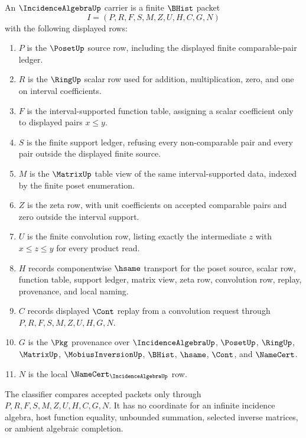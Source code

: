\begin{definition}
\label{def:incidence-algebra-carrier}
An $\IncidenceAlgebraUp$ carrier is a finite $\BHist$ packet
$$
I=(P,R,F,S,M,Z,U,H,C,G,N)
$$
with the following displayed rows:
\begin{enumerate}
\item $P$ is the $\PosetUp$ source row, including the displayed finite comparable-pair ledger.
\item $R$ is the $\RingUp$ scalar row used for addition, multiplication, zero, and one on interval coefficients.
\item $F$ is the interval-supported function table, assigning a scalar coefficient only to displayed pairs $x\leq y$.
\item $S$ is the finite support ledger, refusing every non-comparable pair and every pair outside the displayed finite source.
\item $M$ is the $\MatrixUp$ table view of the same interval-supported data, indexed by the finite poset enumeration.
\item $Z$ is the zeta row, with unit coefficients on accepted comparable pairs and zero outside the interval support.
\item $U$ is the finite convolution row, listing exactly the intermediate $z$ with $x\leq z\leq y$ for every product read.
\item $H$ records componentwise $\hsame$ transport for the poset source, scalar row, function table, support ledger, matrix view, zeta row, convolution row, replay, provenance, and local naming.
\item $C$ records displayed $\Cont$ replay from a convolution request through $P,R,F,S,M,Z,U,H,G,N$.
\item $G$ is the $\Pkg$ provenance over $\IncidenceAlgebraUp$, $\PosetUp$, $\RingUp$, $\MatrixUp$, $\MobiusInversionUp$, $\BHist$, $\hsame$, $\Cont$, and $\NameCert$.
\item $N$ is the local $\NameCert_{\IncidenceAlgebraUp}$ row.
\end{enumerate}
The classifier compares accepted packets only through $P,R,F,S,M,Z,U,H,C,G,N$. It has no coordinate for an infinite incidence algebra, host function equality, unbounded summation, selected inverse matrices, or ambient algebraic completion.
\end{definition}

